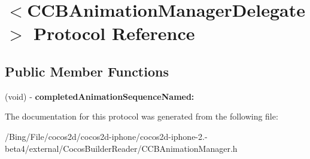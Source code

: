 \hypertarget{protocol_c_c_b_animation_manager_delegate-p}{\section{$<$C\-C\-B\-Animation\-Manager\-Delegate$>$ Protocol Reference}
\label{protocol_c_c_b_animation_manager_delegate-p}
}
\subsection*{Public Member Functions}
\begin{DoxyCompactItemize}
\item 
\hypertarget{protocol_c_c_b_animation_manager_delegate-p_a352607d985237b7e64cac474e9b03788}{(void) -\/ {\bfseries completed\-Animation\-Sequence\-Named\-:}}\label{protocol_c_c_b_animation_manager_delegate-p_a352607d985237b7e64cac474e9b03788}

\end{DoxyCompactItemize}


The documentation for this protocol was generated from the following file\-:\begin{DoxyCompactItemize}
\item 
/\-Bing/\-File/cocos2d/cocos2d-\/iphone/cocos2d-\/iphone-\/2.-\/beta4/external/\-Cocos\-Builder\-Reader/C\-C\-B\-Animation\-Manager.\-h\end{DoxyCompactItemize}
